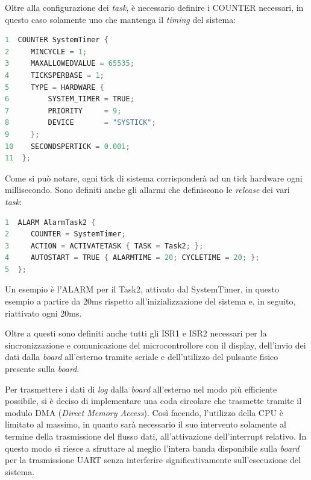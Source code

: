 \documentclass{article}
\begin{document}
Oltre alla configurazione dei \textit{task}, è necessario definire i COUNTER necessari, in questo caso solamente uno che mantenga il \textit{timing} del sistema:
\begin{lstlisting}[language=C]
1  COUNTER SystemTimer {
2	  MINCYCLE = 1;                
3	  MAXALLOWEDVALUE = 65535;    
4	  TICKSPERBASE = 1;            
5	  TYPE = HARDWARE {          
6		  SYSTEM_TIMER = TRUE;
7		  PRIORITY     = 9;         
8		  DEVICE       = "SYSTICK";
9	  };
10	  SECONDSPERTICK = 0.001; 
11  };
\end{lstlisting}
Come si può notare, ogni tick di sistema corrisponderà ad un tick hardware ogni millisecondo.
Sono definiti anche gli allarmi che definiscono le \textit{release} dei vari \textit{task}:
\begin{lstlisting}[language=C]
1  ALARM AlarmTask2 {
2	  COUNTER = SystemTimer;
3	  ACTION = ACTIVATETASK { TASK = Task2; };
4	  AUTOSTART = TRUE { ALARMTIME = 20; CYCLETIME = 20; };
5  };
\end{lstlisting}
Un esempio è l'ALARM per il Task2, attivato dal SystemTimer, in questo esempio a partire da 20ms rispetto all'inizializzazione del sistema e, in seguito, riattivato ogni 20ms.

Oltre a questi sono definiti anche tutti gli ISR1 e ISR2 necessari per la sincronizzazione e comunicazione del microcontrollore con il display, dell'invio dei dati dalla \textit{board} all'esterno tramite seriale e dell'utilizzo del pulsante fisico presente sulla \textit{board}.

Per trasmettere i dati di \textit{log} dalla \textit{board} all'esterno nel modo più efficiente possibile, si è deciso di implementare una coda circolare che trasmette tramite il modulo DMA (\textit{Direct Memory Access}). Così facendo, l'utilizzo della CPU è limitato al massimo, in quanto sarà necessario il suo intervento solamente al termine della trasmissione del flusso dati, all'attivazione dell'interrupt relativo. In questo modo si riesce a sfruttare al meglio l'intera banda disponibile sulla \textit{board} per la trasmissione UART senza interferire significativamente sull'esecuzione del sistema.
\end{document}
